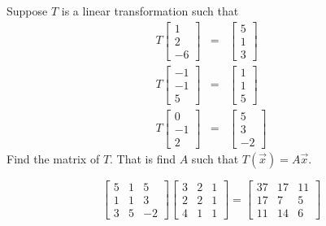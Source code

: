 \documentclass{ximera}
\begin{document}
\begin{problem}\label{prb:10.93} Suppose $T$ is a linear transformation such that
\begin{eqnarray*}
T\left[
\begin{array}{r}
1 \\
2 \\
-6
\end{array}
\right] &=&\left[
\begin{array}{r}
5 \\
1 \\
3
\end{array}
\right] \\
T\left[
\begin{array}{r}
-1 \\
-1 \\
5
\end{array}
\right] &=&\left[
\begin{array}{r}
1 \\
1 \\
5
\end{array}
\right] \\
T\left[
\begin{array}{r}
0 \\
-1 \\
2
\end{array}
\right] &=&\left[
\begin{array}{r}
5 \\
3 \\
-2
\end{array}
\right]
\end{eqnarray*}
Find the matrix of $T$. That is find $A$ such that $T(\vec{x})=A\vec{x}$. \vspace{1mm}
\begin{hint}
\[
\left[
\begin{array}{rrr}
5 & 1 & 5 \\
1 & 1 & 3 \\
3 & 5 & -2
\end{array}
\right] \left[
\begin{array}{ccc}
3 & 2 & 1 \\
2 & 2 & 1 \\
4 & 1 & 1
\end{array}
\right] =\left[
\begin{array}{ccc}
37 & 17 & 11 \\
17 & 7 & 5 \\
11 & 14 & 6
\end{array}
\right]
\]
\end{hint}
\end{problem}
\end{document}
